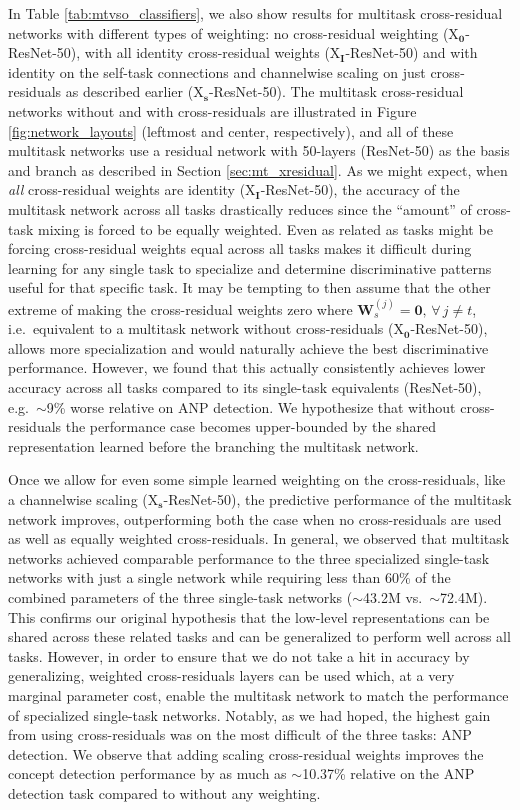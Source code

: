 \documentclass{sig-alternate-05-2015}
\newcommand{\mb}{\mathbf}
\begin{document}
In Table \ref{tab:mtvso_classifiers}, we also show results for multitask cross-residual networks with different types of weighting: no cross-residual weighting (X$_{\mb 0}$-ResNet-50), with all identity cross-residual weights (X$_{\mb I}$-ResNet-50) and with identity on the self-task connections and channelwise scaling on just cross-residuals as described earlier (X$_{\mb s}$-ResNet-50).
The multitask cross-residual networks without and with cross-residuals are illustrated in Figure \ref{fig:network_layouts} (leftmost and center, respectively), and all of these multitask networks use a residual network with 50-layers (ResNet-50) as the basis and branch as described in Section \ref{sec:mt_xresidual}.
As we might expect, when \emph{all} cross-residual weights are identity (X$_{\mb I}$-ResNet-50), the accuracy of the multitask network across all tasks drastically reduces since the ``amount'' of cross-task mixing is forced to be equally weighted.
Even as related as tasks might be forcing cross-residual weights equal across all tasks makes it difficult during learning for any single task to specialize and determine discriminative patterns useful for that specific task.
It may be tempting to then assume that the other extreme of making the cross-residual weights zero where $\mb W_s^{(j)} = \mb 0, \, \forall \, j \neq t$, i.e.~equivalent to a multitask network without cross-residuals (X$_{\mb 0}$-ResNet-50), allows more specialization and would naturally achieve the best discriminative performance.
However, we found that this actually consistently achieves lower accuracy across all tasks compared to its single-task equivalents (ResNet-50), e.g.~$\sim$9\% worse relative on ANP detection.
We hypothesize that without cross-residuals the performance case becomes upper-bounded by the shared representation learned before the branching the multitask network.

Once we allow for even some simple learned weighting on the cross-residuals, like a channelwise scaling (X$_{\mb s}$-ResNet-50), the predictive performance of the multitask network improves, outperforming both the case when no cross-residuals are used as well as equally weighted cross-residuals.
In general, we observed that multitask networks achieved comparable performance to the three specialized single-task networks with just a single network while requiring less than 60\% of the combined parameters of the three single-task networks ($\sim$43.2M vs.~$\sim$72.4M).
This confirms our original hypothesis that the low-level representations can be shared across these related tasks and can be generalized to perform well across all tasks.
However, in order to ensure that we do not take a hit in accuracy by generalizing, weighted cross-residuals layers can be used which, at a very marginal parameter cost, enable the multitask network to match the performance of specialized single-task networks.
Notably, as we had hoped, the highest gain from using cross-residuals was on the most difficult of the three tasks: ANP detection.
We observe that adding scaling cross-residual weights improves the concept detection performance by as much as $\sim$10.37\% relative on the ANP detection task compared to without any weighting.
\end{document}
